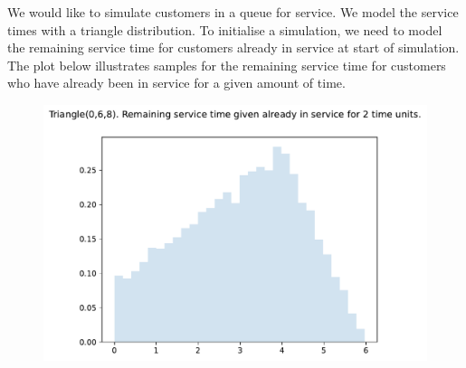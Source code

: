 \documentclass{article}
\begin{document}
We would like to simulate customers in a queue for service. We model the service times with a triangle distribution. To initialise a simulation, we need to model the remaining service time for customers already in service at start of simulation.  The plot below illustrates samples for the remaining service time for customers who have already been in service for a given amount of time. 
\begin{figure}[h]
  \includegraphics[scale=0.7]{./../experiment1/triangle_dist.pdf}
  \label{fig:triangle}
\end{figure}
\end{document}
